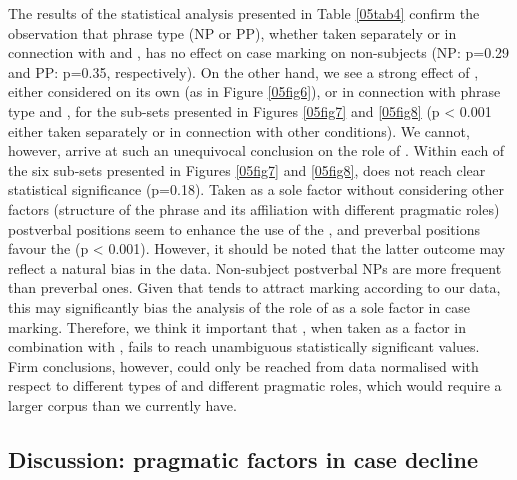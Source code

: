 \documentclass[output=paper,colorlinks,citecolor=brown]{langscibook}
\begin{document}
The results of the statistical analysis presented in Table \ref{05tab4} confirm the observation that phrase type (NP or PP), whether taken separately or in connection with  and , has no effect on case marking on non-subjects (NP: p=0.29 and PP: p=0.35, respectively). On the other hand, we see a strong effect of , either considered on its own (as in Figure \ref{05fig6}), or in connection with phrase type and , for the sub-sets presented in Figures \ref{05fig7} and \ref{05fig8} (p \textless{} 0.001 either taken separately or in connection with other conditions). We cannot, however, arrive at such an unequivocal conclusion on the role of . Within each of the six sub-sets presented in Figures \ref{05fig7} and \ref{05fig8},  does not reach clear statistical significance (p=0.18). Taken as a sole factor without considering other factors (structure of the phrase and its affiliation with different pragmatic roles) postverbal positions seem to enhance the use of the , and preverbal positions favour the  (p \textless{} 0.001). However, it should be noted that the latter outcome may reflect a natural bias in the data. Non-subject postverbal  NPs are more frequent than preverbal ones. Given that  tends to attract  marking according to our data, this may significantly bias the analysis of the role of  as a sole factor in case marking. Therefore, we think it important that , when taken as a factor in combination with , fails to reach unambiguous statistically significant values. Firm conclusions, however, could only be reached from data normalised with respect to different types of  and different pragmatic roles, which would require a larger corpus than we currently have.

\subsection{Discussion: pragmatic factors in case decline} \label{05sec4.5}
\end{document}
